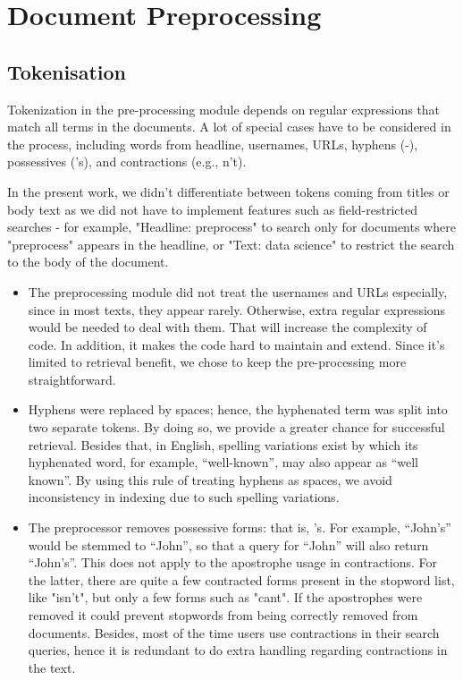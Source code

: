 \section{Document Preprocessing}

\subsection*{Tokenisation}
Tokenization in the pre-processing module depends on regular expressions that match all terms in the documents. A lot of special cases have to be considered in the process, including words from headline, usernames, URLs, hyphens (-), possessives ('s), and contractions (e.g., n't).

In the present work, we didn't differentiate between tokens coming from titles or body text as we did not have to implement features such as field-restricted searches - for example, "Headline: preprocess" to search only for documents where "preprocess" appears in the headline, or "Text: data science" to restrict the search to the body of the document.

\begin{itemize}
    \item The preprocessing module did not treat the usernames and URLs especially, since in most texts, they appear rarely. Otherwise, extra regular expressions would be needed to deal with them. That will increase the complexity of code. In addition, it makes the code hard to maintain and extend. Since it's limited to retrieval benefit, we chose to keep the pre-processing more straightforward.
    \item Hyphens were replaced by spaces; hence, the hyphenated term was split into two separate tokens. By doing so, we provide a greater chance for successful retrieval. Besides that, in English, spelling variations exist by which its hyphenated word, for example, ``well-known'', may also appear as ``well known''. By using this rule of treating hyphens as spaces, we avoid inconsistency in indexing due to such spelling variations.
    \item The preprocessor removes possessive forms: that is, 's.
    For example, ``John's'' would be stemmed to ``John'', so that a query for ``John'' will also return ``John's''. This does not apply to the apostrophe usage in contractions. For the latter, there are quite a few contracted forms present in the stopword list, like "isn't", but only a few forms such as "cant". If the apostrophes were removed it could prevent stopwords from being correctly removed from documents. Besides, most of the time users use contractions in their search queries, hence it is redundant to do extra handling regarding contractions in the text. 
\end{itemize}

